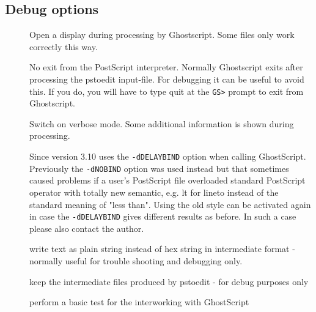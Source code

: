 \documentclass[english,a4paper]{article}
\begin{document}
\subsection{Debug options}
\begin{description}
\item[] 
Open a display during processing by Ghostscript. Some files only work correctly this way. 


\item[] 
No exit from the PostScript interpreter. Normally Ghostscript exits after processing the pstoedit input-file. For debugging it can be useful to avoid this. If you do, you will have to type quit at the \verb+GS>+ prompt to exit from Ghostscript.   


\item[] 
Switch on verbose mode. Some additional information is shown during processing. 


\item[] 
Since version 3.10  uses the \texttt{-dDELAYBIND} option when calling GhostScript. Previously the \texttt{-dNOBIND} option was used instead but that sometimes caused problems if a user's PostScript file overloaded standard PostScript operator with totally new semantic, e.g. lt for lineto instead of the standard meaning of "less than". Using  the old style can be activated again in case the \texttt{-dDELAYBIND} gives different results as before. In such a case please also contact the author. 


\item[] 
write text as plain string instead of hex string in intermediate format - normally useful for trouble shooting and debugging only.


\item[] 
keep the intermediate files produced by pstoedit - for debug purposes only


\item[] 
perform a basic test for the interworking with GhostScript


\end{description}
\end{document}

